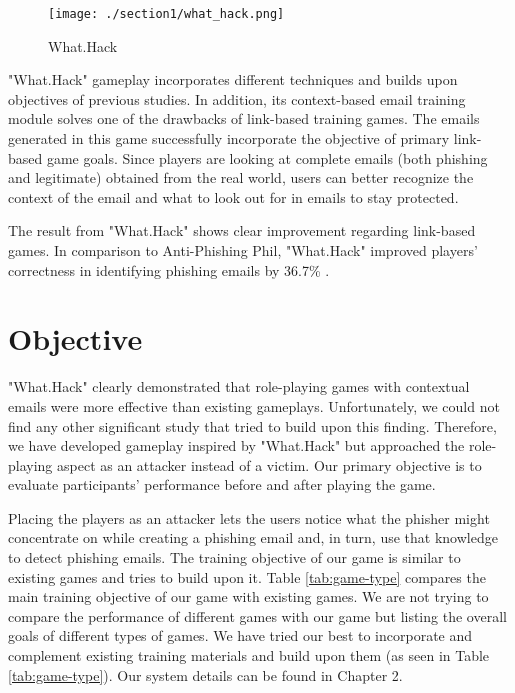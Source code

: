 \begin{figure}[h]
    \centering
    \texttt{[image: ./section1/what\_hack.png]}
    \caption{What.Hack}
\end{figure}

"What.Hack" gameplay incorporates different techniques and builds upon objectives of previous studies. In addition, its context-based email training module solves one of the drawbacks of link-based training games. The emails generated in this game successfully incorporate the objective of primary link-based game goals. Since players are looking at complete emails (both phishing and legitimate) obtained from the real world, users can better recognize the context of the email and what to look out for in emails to stay protected.

The result from "What.Hack" shows clear improvement regarding link-based games. In comparison to Anti-Phishing Phil, "What.Hack" improved players' correctness in identifying phishing emails by 36.7\% \cite{what_hack}.

\section{Objective}

"What.Hack" clearly demonstrated that role-playing games with contextual emails were more effective than existing gameplays. Unfortunately, we could not find any other significant study that tried to build upon this finding. Therefore, we have developed gameplay inspired by "What.Hack" but approached the role-playing aspect as an attacker instead of a victim. Our primary objective is to evaluate participants' performance before and after playing the game.

Placing the players as an attacker lets the users notice what the phisher might concentrate on while creating a phishing email and, in turn, use that knowledge to detect phishing emails. The training objective of our game is similar to existing games and tries to build upon it. Table \ref{tab:game-type} compares the main training objective of our game with existing games. We are not trying to compare the performance of different games with our game but listing the overall goals of different types of games. We have tried our best to incorporate and complement existing training materials and build upon them (as seen in Table \ref{tab:game-type}). Our system details can be found in Chapter 2.

